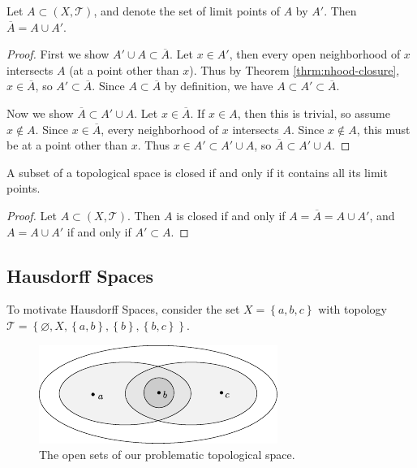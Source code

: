 \documentclass[10pt]{report}
\begin{document}
\begin{thrm}{}{}
	Let $A \subset (X,\mathcal{T})$, and denote the set of limit points of $A$ by $A'$. Then $\overline{A}=A \cup A'$.
\end{thrm}
\begin{proof}
	First we show $A' \cup A \subset \overline{A} $. Let $x \in A'$, then every open neighborhood of $x$ intersects $A$ (at a point other than $x$). Thus by Theorem \ref{thrm:nhood-closure}, $x \in \overline{A}$, so $A' \subset  \overline{A}$. Since $A \subset \overline{A}$ by definition, we have $A \subset A' \subset \overline{A}$.

	Now we show $\overline{A} \subset A' \cup A$. Let $x \in \overline{A}$. If $x \in A$, then this is trivial, so assume $x \not\in A$. Since $x \in \overline{A}$, every neighborhood of $x$ intersects $A$. Since $x \not\in A$, this must be at a point other than $x$. Thus $x \in A'\subset A' \cup A$, so $\overline{A} \subset A' \cup A$.
\end{proof}

\begin{cor}
	A subset of a topological space is closed if and only if it contains all its limit points.
\end{cor}
\begin{proof}
	Let $A \subset (X, \mathcal{T})$. Then $A$ is closed if and only if $A = \overline{A} = A \cup A'$, and $A = A \cup A'$ if and only if $A' \subset A$.
\end{proof}


\subsection{Hausdorff Spaces}

To motivate Hausdorff Spaces, consider the set $X = \left\{ a, b, c \right\}$ with topology $\mathcal{T}= \left\{ \varnothing, X, \left\{ a,b \right\}, \left\{ b \right\}, \left\{ b,c \right\} \right\}$.

\begin{figure}[H]
	\centering
	\includegraphics[scale=1]{fig/non-hausdorff.pdf}
	\caption{The open sets of our problematic topological space.}
\end{figure}
\end{document}
